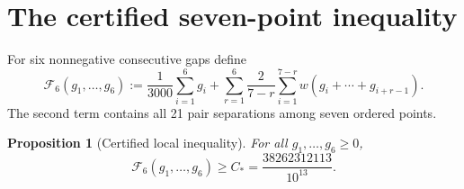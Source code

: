 \documentclass[11pt]{article}
\newtheorem{proposition}[theorem]{Proposition}
\newcommand{\cF}{\mathcal F}
\begin{document}
\section{The certified seven-point inequality}\label{sec:certificate}

For six nonnegative consecutive gaps define
\begin{equation}\label{eq:F6}
 \cF_6(g_1,\ldots,g_6)
 :=\frac1{3000}\sum_{i=1}^6g_i
 +\sum_{r=1}^6\frac2{7-r}
 \sum_{i=1}^{7-r}w(g_i+\cdots+g_{i+r-1}).
\end{equation}
The second term contains all 21 pair separations among seven ordered points.

\begin{proposition}[Certified local inequality]\label{prop:F6}
For all $g_1,\ldots,g_6\ge0$,
\begin{equation}\label{eq:F6-bound}
 \cF_6(g_1,\ldots,g_6)\ge C_*
 =\frac{38262312113}{10^{13}}.
\end{equation}
\end{proposition}
\end{document}
